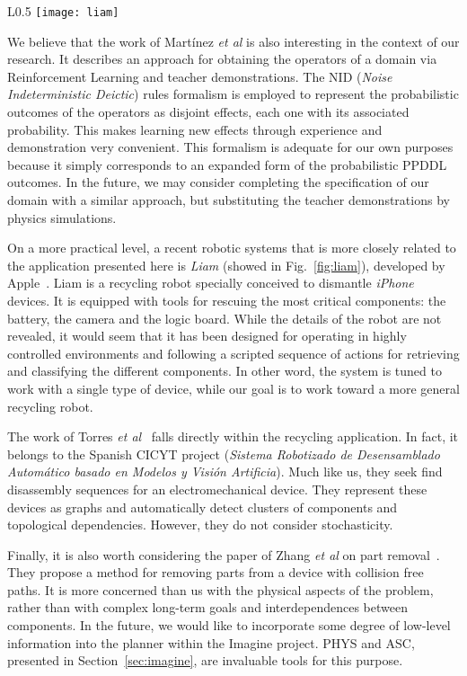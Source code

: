 \documentclass[../root.tex]{subfiles}
\begin{document}
\begin{wrapfigure}{L}{0.5\columnwidth}
	\centering
	\texttt{[image: liam]}
	\caption{Liam robot removing the screen of an iPhone device.
		Source: \url{https://youtu.be/AYshVbcEmUc}}
	\label{fig:liam}
\end{wrapfigure}

We believe that the work of Martínez \textit{et al} is also interesting in the
context of our research. It describes an approach for obtaining the operators
of a domain via Reinforcement Learning and teacher demonstrations. The
NID (\emph{Noise Indeterministic Deictic}) rules formalism is employed to
represent the probabilistic outcomes of the operators as disjoint effects,
each one with its associated probability. This makes learning
new effects through experience and demonstration very convenient.
This formalism is adequate for our own purposes because it simply corresponds
to an expanded form of the probabilistic PPDDL outcomes. In the future, we
may consider completing the specification of our domain with a similar
approach, but substituting the teacher demonstrations by physics simulations.

On a more practical level, a recent robotic systems that is more
closely related to the application
presented here is \emph{Liam} (showed in Fig.~\ref{fig:liam}), developed by Apple~\cite{kamps2016apple}.
Liam is a recycling robot specially conceived to dismantle \emph{iPhone}
devices. It is equipped with tools for rescuing the most critical components:
the battery, the camera and the logic board. While the details of the robot
are not revealed, it would seem that it has been designed for operating
in highly controlled environments and following a scripted sequence of
actions for retrieving and classifying the different components. In other
word, the system is tuned to work with a single type of device, while our
goal is to work toward a more general recycling robot.

The work of Torres \textit{et al}~\cite{torresa2003disassembly} falls
directly within the recycling application. In fact, it belongs to the
Spanish CICYT project (\emph{Sistema Robotizado de Desensamblado
Automático basado en Modelos y Visión Artificia}). Much like us, they
seek find disassembly sequences for an electromechanical device. They
represent these devices as graphs and automatically detect clusters of
components and topological dependencies. However, they do not consider
stochasticity.

Finally, it is also worth considering the paper of
Zhang \textit{et al} on part removal~\cite{zhang2008dplan}. They propose
a method for removing parts from a device with collision free paths. It
is more concerned than us with the physical aspects of the problem,
rather than with complex long-term goals and interdependences between
components. In the future, we would like to incorporate some degree
of low-level information into the planner within the Imagine project.
PHYS and ASC, presented in Section~\ref{sec:imagine}, are invaluable
tools for this purpose.


\end{document}
